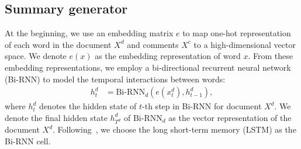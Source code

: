 \documentclass[letterpaper]{article}
\begin{document}
\subsection{Summary generator}

At the beginning, we use an embedding matrix $e$ to map one-hot representation of each word in the document $X^d$ and comments $X^c$ to a high-dimensional vector space.
We denote $e(x)$ as the embedding representation of word $x$.
From these embedding representations, we employ a bi-directional recurrent neural network (Bi-RNN) to model the temporal interactions between words:
\begin{align}
    h^d_t &= \text{Bi-RNN}_d(e(x^d_t), h^d_{t-1}) ,
\end{align}
\noindent where $h^{d}_t$ denotes the hidden state of $t$-th step in Bi-RNN for document $X^d$.
We denote the final hidden state $h^d_{T^d}$ of $\text{Bi-RNN}_d$ as the vector representation of the document $X^d$.
Following~\cite{see2017get,Ma2018AHE}, we choose the long short-term memory (LSTM) as the Bi-RNN cell.
\end{document}
